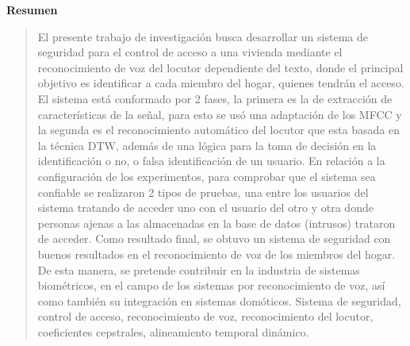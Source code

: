 



\newpage
\begin{center}
 {\bf\LARGE Resumen}
\end{center} 
\begin{quotation}
El presente trabajo de investigación busca desarrollar un sistema de seguridad para el control de acceso a una vivienda mediante el reconocimiento de voz del locutor dependiente del texto, donde el principal objetivo es identificar a cada miembro del hogar, quienes tendrán el acceso.
\vskip 0.1cm
El sistema está conformado por 2 fases, la primera es la de extracción de características de la señal, para esto se usó una adaptación de los MFCC y la segunda es el reconocimiento automático del locutor que esta basada en la técnica DTW, además de una lógica para la toma de decisión en la identificación o no, o falsa identificación de un usuario. En relación a la configuración de los experimentos, para comprobar que el sistema sea confiable se realizaron 2 tipos de pruebas, una entre los usuarios del sistema tratando de acceder uno con el usuario del otro y otra donde personas ajenas a las almacenadas en la base de datos (intrusos) trataron de acceder.
\vskip 0.1cm
Como resultado final, se obtuvo un sistema de seguridad con buenos resultados en el reconocimiento de voz de los miembros del hogar. De esta manera, se pretende contribuir en la industria de sistemas biométricos, en el campo de los sistemas por reconocimiento de voz, así como también su integración en sistemas domóticos.
\vskip 0.1cm
\hspace*{-0.6cm}{\bf Palabras claves:} Sistema de seguridad, control de acceso, reconocimiento de voz, reconocimiento del locutor, coeficientes cepstrales, alineamiento temporal dinámico.
\end{quotation}


